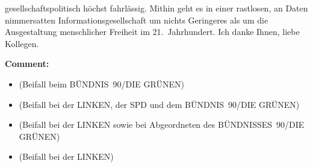 \documentclass{article}
\begin{document}
gesellschaftspolitisch höchst fahrlässig. Mithin geht es in einer rastlosen, an Daten nimmersatten Informationsgesellschaft um nichts Geringeres als um die Ausgestaltung menschlicher Freiheit im 21. Jahrhundert. Ich danke Ihnen, liebe Kollegen.  

\noindent\textbf{Comment:}
\begin{itemize}
    \setlength\itemsep{-3pt}
    \item (Beifall beim BÜNDNIS 90/DIE GRÜNEN)
    \setlength\itemsep{-3pt}
    \item (Beifall bei der LINKEN, der SPD und dem BÜNDNIS 90/DIE GRÜNEN)
    \setlength\itemsep{-3pt}
    \item (Beifall bei der LINKEN sowie bei Abgeordneten des BÜNDNISSES 90/DIE GRÜNEN)
    \setlength\itemsep{-3pt}
    \item (Beifall bei der LINKEN)
\end{itemize}
\end{document}
